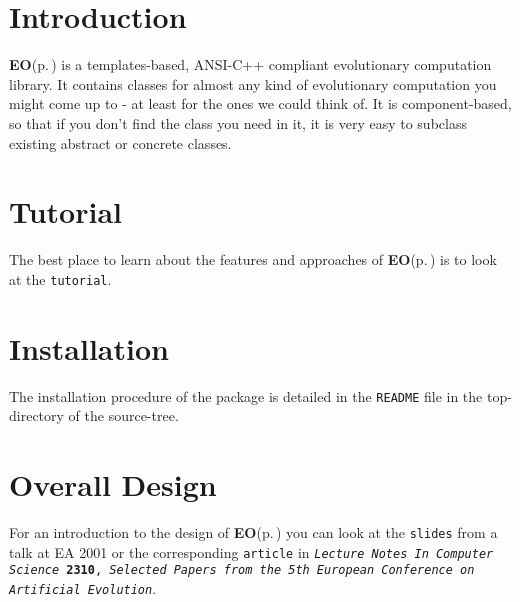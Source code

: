 \section{Introduction}\label{main_intro}
{\bf EO}{\rm (p.\,\pageref{class_e_o})} is a templates-based, ANSI-C++ compliant evolutionary computation library. It contains classes for almost any kind of evolutionary computation you might come up to - at least for the ones we could think of. It is component-based, so that if you don't find the class you need in it, it is very easy to subclass existing abstract or concrete classes.\section{Tutorial}\label{main_tutorial}
The best place to learn about the features and approaches of {\bf EO}{\rm (p.\,\pageref{class_e_o})} is to look at the {\tt tutorial}.\section{Installation}\label{main_install}
The installation procedure of the package is detailed in the {\tt README} file in the top-directory of the source-tree.\section{Overall Design}\label{main_design}
For an introduction to the design of {\bf EO}{\rm (p.\,\pageref{class_e_o})} you can look at the {\tt slides} from a talk at EA 2001 or the corresponding {\tt article} in {\tt {\em Lecture Notes In Computer Science\/} {\bf 2310}, {\em Selected Papers from the 5th European Conference on Artificial Evolution\/}}. 
